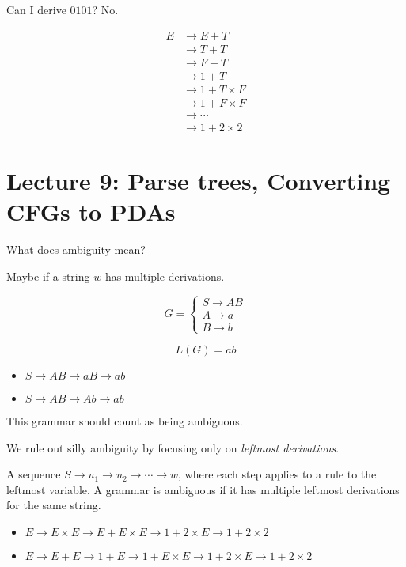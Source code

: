 Can I derive $0101$? No.

\begin{align*}
  E
  &\rightarrow E + T \\
  &\rightarrow T + T \\
  &\rightarrow F + T \\
  &\rightarrow 1 + T \\
  &\rightarrow 1 + T \times F \\
  &\rightarrow 1 + F \times F \\
  &\rightarrow \cdots \\
  &\rightarrow 1 + 2 \times 2
\end{align*}

\section*{Lecture 9: Parse trees, Converting CFGs to PDAs}

What does ambiguity mean?

Maybe if a string $w$ has multiple derivations.

\begin{example}
    \[
        G =
        \begin{cases}
            S \rightarrow AB \\
            A \rightarrow a \\
         B \rightarrow b
        \end{cases}
    \]

    \begin{equation*}
        L(G) = ab
      \end{equation*}

      \begin{itemize}
        \item $S \rightarrow AB \rightarrow aB \rightarrow ab$
        \item $S \rightarrow AB \rightarrow Ab \rightarrow ab$
      \end{itemize}
\end{example}

This grammar should count as being ambiguous.

We rule out silly ambiguity by focusing only on \emph{leftmost derivations}.

A sequence $S \rightarrow u_1 \rightarrow u_2 \rightarrow \cdots \rightarrow w$, where each step applies to a rule to the leftmost variable. A grammar is ambiguous if it has multiple leftmost derivations for the same string.

\begin{itemize}
    \item $E \rightarrow E \times E \rightarrow E + E \times E \rightarrow 1 + 2 \times E \rightarrow 1 + 2 \times 2$
    \item $E \rightarrow E + E \rightarrow 1 + E \rightarrow 1 + E \times E \rightarrow 1 + 2 \times E \rightarrow 1 + 2 \times 2$
\end{itemize}
